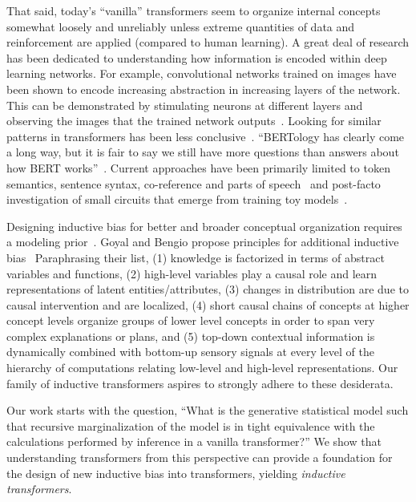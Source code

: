 \documentclass{article}
\begin{document}
That said, today's ``vanilla'' transformers seem to organize internal concepts somewhat loosely and unreliably unless extreme quantities of data and reinforcement are applied (compared to human learning). A great deal of research has been dedicated to understanding how information is encoded within deep learning networks. For example, convolutional networks trained on images have been shown to encode increasing abstraction in increasing layers of the network.  This can be demonstrated by stimulating neurons at different layers and observing the images that the trained network outputs~\citep{doi:10.1073/pnas.1907375117}.  Looking for similar patterns in transformers has been less conclusive~\citep{clark-etal-2019-bert}. ``BERTology has clearly come a long way, but it is fair to say we still have more questions than answers about how BERT works''~\citep{rogers2020primer}.  Current approaches have been primarily limited to token semantics, sentence syntax, co-reference and parts of speech~\cite{clark-etal-2019-bert} and post-facto investigation of small circuits that emerge from training toy models~\citep{elhage2021mathematical}.

Designing inductive bias for better and broader conceptual organization requires a modeling prior~\citep{frankle2019lottery}.  Goyal and Bengio propose principles for additional inductive bias~\citep{goyal2022inductive} Paraphrasing their list, (1) knowledge is factorized in terms of abstract variables and functions, (2) high-level variables play a causal role and learn representations of latent entities/attributes, (3) changes in distribution are due to causal intervention and are localized, (4) short causal chains of concepts at higher concept levels organize groups of lower level concepts in order to span very complex explanations or plans, and (5) top-down contextual information is dynamically combined with bottom-up sensory signals at every level of the hierarchy of computations relating low-level and high-level representations.  Our family of inductive transformers aspires to strongly adhere to these desiderata.

Our work starts with the question, ``What is the generative statistical model such that recursive marginalization of the model is in tight equivalence with the calculations performed by inference in a vanilla transformer?''  We show that understanding transformers from this perspective can provide a foundation for the design of new inductive bias into transformers, yielding \emph{inductive transformers}.
\end{document}
